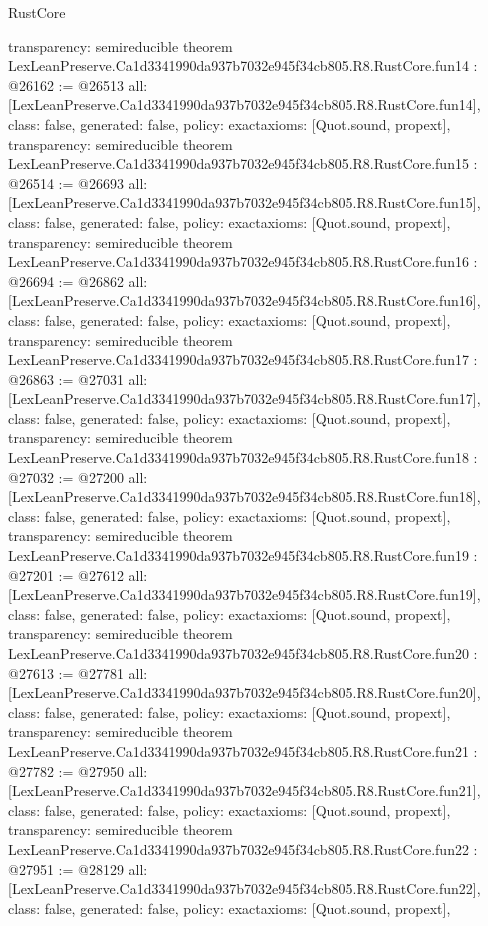 \begin{lexlean}{RustCore}
\begin{coremodule}
{  transparency: semireducible
}
theorem LexLeanPreserve.Ca1d3341990da937b7032e945f34cb805.R8.RustCore.fun14 : @26162 := @26513 {
  all: [LexLeanPreserve.Ca1d3341990da937b7032e945f34cb805.R8.RustCore.fun14],
  class: false,
  generated: false,
  policy: exact{axioms: [Quot.sound, propext]},
  transparency: semireducible
}
theorem LexLeanPreserve.Ca1d3341990da937b7032e945f34cb805.R8.RustCore.fun15 : @26514 := @26693 {
  all: [LexLeanPreserve.Ca1d3341990da937b7032e945f34cb805.R8.RustCore.fun15],
  class: false,
  generated: false,
  policy: exact{axioms: [Quot.sound, propext]},
  transparency: semireducible
}
theorem LexLeanPreserve.Ca1d3341990da937b7032e945f34cb805.R8.RustCore.fun16 : @26694 := @26862 {
  all: [LexLeanPreserve.Ca1d3341990da937b7032e945f34cb805.R8.RustCore.fun16],
  class: false,
  generated: false,
  policy: exact{axioms: [Quot.sound, propext]},
  transparency: semireducible
}
theorem LexLeanPreserve.Ca1d3341990da937b7032e945f34cb805.R8.RustCore.fun17 : @26863 := @27031 {
  all: [LexLeanPreserve.Ca1d3341990da937b7032e945f34cb805.R8.RustCore.fun17],
  class: false,
  generated: false,
  policy: exact{axioms: [Quot.sound, propext]},
  transparency: semireducible
}
theorem LexLeanPreserve.Ca1d3341990da937b7032e945f34cb805.R8.RustCore.fun18 : @27032 := @27200 {
  all: [LexLeanPreserve.Ca1d3341990da937b7032e945f34cb805.R8.RustCore.fun18],
  class: false,
  generated: false,
  policy: exact{axioms: [Quot.sound, propext]},
  transparency: semireducible
}
theorem LexLeanPreserve.Ca1d3341990da937b7032e945f34cb805.R8.RustCore.fun19 : @27201 := @27612 {
  all: [LexLeanPreserve.Ca1d3341990da937b7032e945f34cb805.R8.RustCore.fun19],
  class: false,
  generated: false,
  policy: exact{axioms: [Quot.sound, propext]},
  transparency: semireducible
}
theorem LexLeanPreserve.Ca1d3341990da937b7032e945f34cb805.R8.RustCore.fun20 : @27613 := @27781 {
  all: [LexLeanPreserve.Ca1d3341990da937b7032e945f34cb805.R8.RustCore.fun20],
  class: false,
  generated: false,
  policy: exact{axioms: [Quot.sound, propext]},
  transparency: semireducible
}
theorem LexLeanPreserve.Ca1d3341990da937b7032e945f34cb805.R8.RustCore.fun21 : @27782 := @27950 {
  all: [LexLeanPreserve.Ca1d3341990da937b7032e945f34cb805.R8.RustCore.fun21],
  class: false,
  generated: false,
  policy: exact{axioms: [Quot.sound, propext]},
  transparency: semireducible
}
theorem LexLeanPreserve.Ca1d3341990da937b7032e945f34cb805.R8.RustCore.fun22 : @27951 := @28129 {
  all: [LexLeanPreserve.Ca1d3341990da937b7032e945f34cb805.R8.RustCore.fun22],
  class: false,
  generated: false,
  policy: exact{axioms: [Quot.sound, propext]},
}
\end{coremodule}
\end{lexlean}
